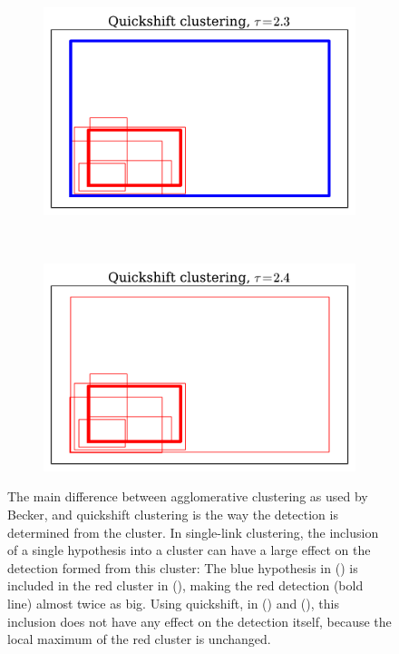 \begin{figure}[hbt]
    \begin{subfigure}[b]{0.30\textwidth}
            \centering
            \includegraphics[width=\textwidth]{visQS23_2}
            \caption{}
            \label{fig:slvqs_qs1}
    \end{subfigure}
    ~
    \begin{subfigure}[b]{0.30\textwidth}
            \centering
            \includegraphics[width=\textwidth]{visQS24_2}
            \caption{}
            \label{fig:slvqs_qs2}
    \end{subfigure}
    \caption{The main difference between agglomerative clustering as used by Becker, and quickshift clustering is the way the detection is determined from the cluster. In single-link clustering, the inclusion of a single hypothesis into a cluster can have a large effect on the detection formed from this cluster: The blue hypothesis in () is included in the red cluster in (), making the red detection (bold line) almost twice as big. Using quickshift, in () and (), this inclusion does not have any effect on the detection itself, because the local maximum of the red cluster is unchanged.}
    \label{fig:sl_vs_qs_clustering}
\end{figure}

